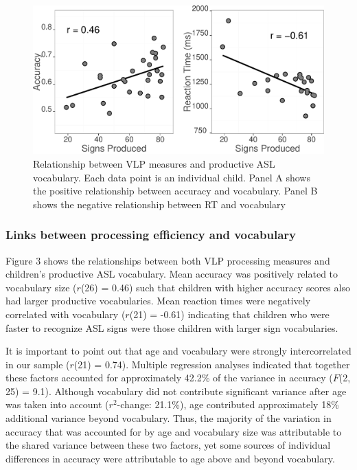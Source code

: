 \documentclass[12pt,]{article}
\begin{document}
\begin{figure}[htbp]
\centering
\includegraphics{Figs/vocab scatter plots-1.pdf}
\caption{Relationship between VLP measures and productive ASL
vocabulary. Each data point is an individual child. Panel A shows the
positive relationship between accuracy and vocabulary. Panel B shows the
negative relationship between RT and vocabulary}
\end{figure}

\subsubsection{Links between processing efficiency and
vocabulary}\label{links-between-processing-efficiency-and-vocabulary}

Figure 3 shows the relationships between both VLP processing measures
and children's productive ASL vocabulary. Mean accuracy was positively
related to vocabulary size (\(r\)(26) = 0.46) such that children with
higher accuracy scores also had larger productive vocabularies. Mean
reaction times were negatively correlated with vocabulary (\(r\)(21) =
-0.61) indicating that children who were faster to recognize ASL signs
were those children with larger sign vocabularies.

It is important to point out that age and vocabulary were strongly
intercorrelated in our sample (\(r\)(21) = 0.74). Multiple regression
analyses indicated that together these factors accounted for
approximately 42.2\% of the variance in accuracy (\(F\)(2, 25) = 9.1).
Although vocabulary did not contribute significant variance after age
was taken into account (\(r^2\)-change: 21.1\%), age contributed
approximately 18\% additional variance beyond vocabulary. Thus, the
majority of the variation in accuracy that was accounted for by age and
vocabulary size was attributable to the shared variance between these
two factors, yet some sources of individual differences in accuracy were
attributable to age above and beyond vocabulary.
\end{document}
